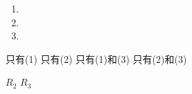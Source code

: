 \question\vspace{1cm}
\begin{samepage}
    \begin{enumerate}[label=\sd]
        \item
              \par
        \item
              \par
        \item
              \par
    \end{enumerate}
\end{samepage}
\begin{samepage}
    \begin{choices}
        \choice 只有(1)
        \choice 只有(2)
        \choice 只有(1)和(3)
        \choice 只有(2)和(3)
    \end{choices}
\end{samepage}

\begin{samepage}
    \question\vspace{1cm}

    \begin{choices}
        \choice
        \choice
        \choice
        \choice
    \end{choices}
\end{samepage}



\question\vspace{1cm}
\begin{samepage}
    \par\hspace{4.5em}$R_2$\hspace{7em} $R_3$
    \begin{choices}
        \choice
        \choice
        \choice
        \choice
    \end{choices}
\end{samepage}

\question
\begin{choices}
    \begin{multicols}{2}
        \choice
        \choice
    \end{multicols}\par
    \begin{multicols}{2}
        \choice
        \CorrectChoice
    \end{multicols}
\end{choices}

